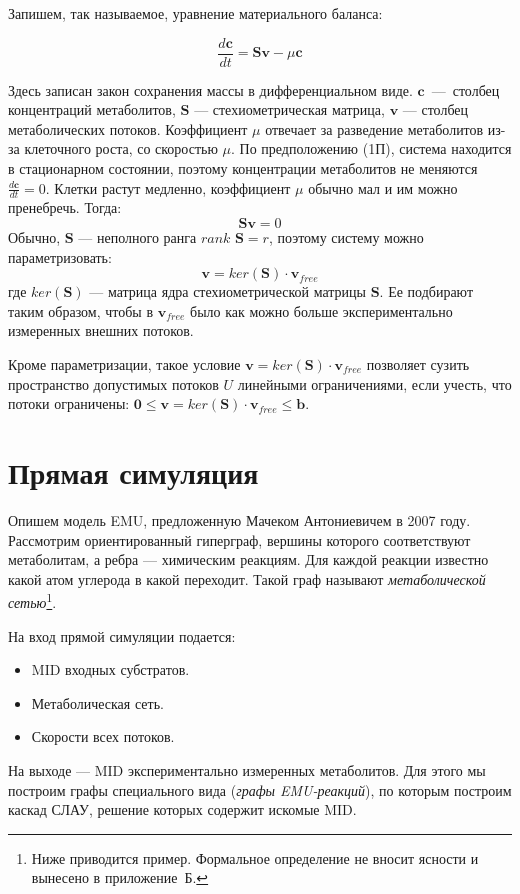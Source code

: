 \documentclass[14pt, a4paper]{extreport}
\begin{document}
Запишем, так называемое, уравнение материального баланса:

$$\frac{d\textbf{c}}{dt} = \textbf{Sv} - \mu{}\textbf{c}$$

Здесь записан закон сохранения массы в дифференциальном виде. $\textbf{c}$~---~столбец концентраций метаболитов, $\textbf{S}$ --- стехиометрическая матрица, $\textbf{v}$ --- столбец метаболических потоков. Коэффициент $\mu$ отвечает за разведение метаболитов из-за клеточного роста, со скоростью $\mu$. По предположению (1П), система находится в стационарном состоянии, поэтому концентрации метаболитов не меняются $\frac{d\textbf{c}}{dt} = 0$. Клетки растут медленно, коэффициент $\mu$ обычно мал и им можно пренебречь. Тогда:
$$ \textbf{Sv} = 0$$
Обычно, $\boldsymbol{S}$ --- неполного ранга $rank{ } \textbf{ S} = r$, поэтому систему можно параметризовать:
$$ \boldsymbol{v} = ker(\boldsymbol{S}) \cdot \boldsymbol{v}_{free}$$
где $ker(\textbf{S})$ --- матрица ядра стехиометрической матрицы $\boldsymbol{S}$. Ее подбирают таким образом, чтобы в $\boldsymbol{v}_{free}$ было как можно больше экспериментально измеренных внешних потоков.

Кроме параметризации, такое условие $\boldsymbol{v} = ker(\boldsymbol{S}) \cdot \boldsymbol{v}_{free}$ позволяет сузить пространство допустимых потоков $U$ линейными ограничениями, если учесть, что потоки ограничены: $\boldsymbol{0} \le \boldsymbol{v} = ker(\boldsymbol{S}) \cdot \boldsymbol{v}_{free} \le \boldsymbol{b}$.



\clearpage
\section{Прямая симуляция}
Опишем модель EMU, предложенную Мачеком Антониевичем в 2007 году\cite{EMU_2007}. Рассмотрим ориентированный гиперграф, вершины которого соответствуют метаболитам, а ребра --- химическим реакциям. Для каждой реакции известно какой атом углерода в какой переходит. Такой граф называют \emph{метаболической сетью}\footnote{Ниже приводится пример. Формальное определение не вносит ясности и вынесено в приложение~Б.}. 

На вход прямой симуляции подается:
\begin{itemize}
	\item MID входных субстратов.
	\item Метаболическая сеть.
	\item Скорости всех потоков.
\end{itemize}
На выходе --- MID экспериментально измеренных метаболитов.
Для этого мы построим графы специального вида (\emph{графы EMU-реакций}), по которым построим каскад СЛАУ, решение которых содержит искомые MID.
\end{document}
